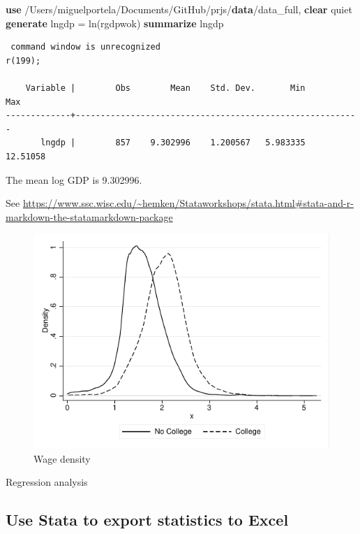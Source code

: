 \documentclass[
  12pt,
]{article}
\newenvironment{Shaded}{\begin{snugshade}}{\end{snugshade}}
\newcommand{\FunctionTok}[1]{\textcolor[rgb]{0.00,0.00,0.00}{#1}}
\newcommand{\KeywordTok}[1]{\textcolor[rgb]{0.13,0.29,0.53}{\textbf{#1}}}
\newcommand{\NormalTok}[1]{#1}
\begin{document}
\begin{Shaded}
\begin{Highlighting}[]
\KeywordTok{use}\NormalTok{ /Users/miguelportela/Documents/GitHub/prjs/}\KeywordTok{data}\NormalTok{/data_full, }\KeywordTok{clear}
\NormalTok{        quiet }\KeywordTok{generate}\NormalTok{ lngdp = }\FunctionTok{ln}\NormalTok{(rgdpwok)}
      \KeywordTok{summarize}\NormalTok{ lngdp}
\end{Highlighting}
\end{Shaded}

\begin{verbatim}
 command window is unrecognized
r(199);

    Variable |        Obs        Mean    Std. Dev.       Min        Max
-------------+---------------------------------------------------------
       lngdp |        857    9.302996    1.200567   5.983335   12.51058
\end{verbatim}

The mean log GDP is 9.302996.

See \url{https://www.ssc.wisc.edu/~hemken/Stataworkshops/stata.html\#stata-and-r-markdown-the-statamarkdown-package}

\begin{figure}
\centering
\includegraphics{logs/density.pdf}
\caption{Wage density}
\end{figure}

\begin{table}[ht]
\caption{Regression analysis}
\label{tab:stata}
  
\end{table}

\hypertarget{use-stata-to-export-statistics-to-excel}{%
\subsection{Use Stata to export statistics to Excel}\label{use-stata-to-export-statistics-to-excel}}
\end{document}
